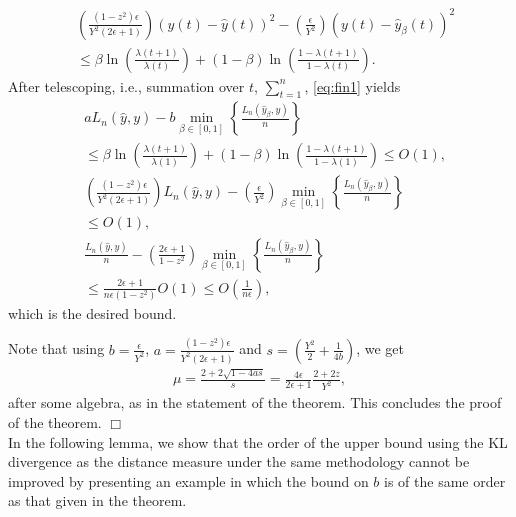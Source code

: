\documentclass[journal]{IEEEtran}
\newcommand{\nn}{\nonumber}
\begin{document}
\begin{align}
&\left(\frac{(1-z^2) \epsilon}{Y^2 (2\epsilon+1)}\right)
(y(t)-\hat{y}(t))^2 - \left( \frac{\epsilon}{Y^2}\right)
(y(t)- \hat{y}_{\beta}(t))^2  \nn\\&\leq
\beta \ln\left(\frac{\lambda(t+1)}{\lambda(t)}\right)+(1-\beta) \ln\left(\frac{1-\lambda(t+1)}{1-\lambda(t)}\right). \label{eq:fin1}
\end{align}\normalsize
After telescoping, i.e., summation over $t$, $\sum_{t=1}^n$,
\eqref{eq:fin1} yields
\small
\begin{align}
&aL_n(\hat{y},y)-b \min\limits_{\beta\in[0,1]} \left\{ \frac{L_n(\hat{y}_{\beta},y)}{n}\right\} \nn\\
&\leq \beta \ln\left(\frac{\lambda(t+1)}{\lambda(1)}\right)+(1-\beta) \ln\left(\frac{1-\lambda(t+1)}{1-\lambda(1)}\right)  \leq  O(1), \nonumber \\
&\left(\frac{(1-z^2) \epsilon}{Y^2 (2\epsilon+1)}\right) L_n(\hat{y},y)- \left(\frac{\epsilon}{Y^2}\right) \min\limits_{\beta\in[0,1]} \left\{ \frac{L_n(\hat{y}_{\beta},y)}{n}\right\}  \nn\\
&\leq O(1), \nonumber \\
&\frac{L_n(\hat{y},y)}{n}-\left( \frac{2 \epsilon+1}{1-z^2}\right) \min\limits_{\beta\in[0,1]} \left\{ \frac{L_n(\hat{y}_{\beta},y)}{n}\right\} \nn\\ &\leq \frac{2 \epsilon+1}{n\epsilon(1-z^2)}O(1) \leq O\left( \frac{1}{n\epsilon} \right),
\end{align}\normalsize
which is the desired bound.

Note that using $b = \frac{\epsilon}{Y^2}$, $a = \frac{(1-z^2) \epsilon}{Y^2
  (2\epsilon+1)}$ and $s = \left(\frac{Y^2}{2} + \frac{1}{4b}\right)$, we get
\begin{align*}
\mu = \frac{2+2\sqrt{1-4as}}{s} = \frac{4 \epsilon}{2\epsilon+1}\frac{2+2z}{Y^2}, \label{eq:mue}
\end{align*}\normalsize
after some algebra, as in the statement of the theorem.  This
concludes the proof of the theorem. $\Box$ \\

In the following lemma, we show that the order of the upper bound
using the KL divergence as the distance measure under the same
methodology cannot be improved by presenting an example in which the
bound on $b$ is of the same order as that given in the theorem.\\
\end{document}
